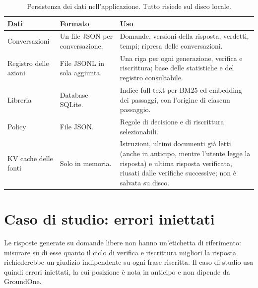 \begin{table}[htbp]
\centering
\caption{Persistenza dei dati nell'applicazione. Tutto risiede sul disco locale.}
\label{tab:studio-persistence}
\small
\begin{tabular}{>{\raggedright\arraybackslash}p{3.6cm}>{\raggedright\arraybackslash}p{3.4cm}>{\raggedright\arraybackslash}p{6.0cm}}
\toprule
Dati & Formato & Uso \\
\midrule
Conversazioni & Un file JSON per conversazione. & Domande, versioni della risposta, verdetti, tempi; ripresa delle conversazioni. \\ \addlinespace[2pt]
Registro delle azioni & File JSONL in sola aggiunta. & Una riga per ogni generazione, verifica e riscrittura; base delle statistiche e del registro consultabile. \\ \addlinespace[2pt]
Libreria & Database SQLite. & Indice full-text per BM25 ed embedding dei passaggi, con l'origine di ciascun passaggio. \\ \addlinespace[2pt]
Policy & File JSON. & Regole di decisione e di riscrittura selezionabili. \\ \addlinespace[2pt]
KV cache delle fonti & Solo in memoria. & Istruzioni, ultimi documenti già letti (anche in anticipo, mentre l'utente legge la risposta) e ultima risposta verificata, riusati dalle verifiche successive; non è salvata su disco. \\
\bottomrule
\end{tabular}
\end{table}

\section{Caso di studio: errori iniettati}
\label{sec:studio-casestudy}

Le risposte generate su domande libere non hanno un'etichetta di riferimento: misurare su di esse quanto il ciclo di
verifica e riscrittura migliori la risposta richiederebbe un giudizio indipendente su ogni frase riscritta. Il caso di
studio usa quindi errori iniettati, la cui posizione è nota in anticipo e non dipende da GroundOne.

